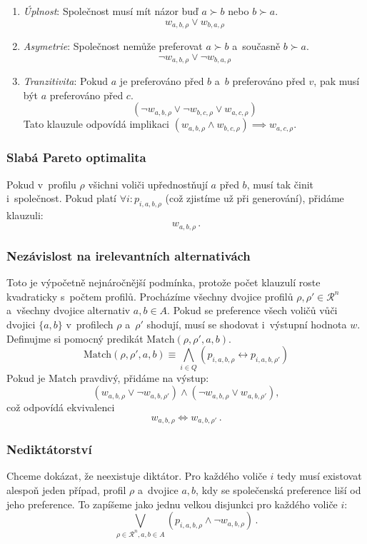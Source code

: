 \documentclass[a4paper, 11pt]{article}
\begin{document}
\begin{enumerate}
    \item \emph{Úplnost}: Společnost musí mít názor buď $a \succ b$ nebo $b \succ a$.
          \[
              w_{a, b, \rho} \lor w_{b, a, \rho}
          \]
    \item \emph{Asymetrie}: Společnost nemůže preferovat $a \succ b$ a~současně $b \succ a$.
          \[
              \neg w_{a, b, \rho} \lor \neg w_{b, a, \rho}
          \]
    \item \emph{Tranzitivita}: Pokud $a$ je preferováno před $b$ a~$b$ preferováno před $v$, pak musí být $a$ preferováno před $c$.
          \[
              (\neg w_{a, b, \rho} \lor \neg w_{b, c, \rho} \lor w_{a, c, \rho})
          \]
          Tato klauzule odpovídá implikaci $(w_{a, b, \rho} \land w_{b, c, \rho}) \implies w_{a, c, \rho}$.
\end{enumerate}

\subsubsection{Slabá Pareto optimalita}
Pokud v~profilu $\rho$ všichni voliči upřednostňují $a$ před $b$, musí tak činit i~společnost.
Pokud platí $\forall i \colon p_{i, a, b, \rho}$ (což zjistíme už při generování), přidáme klauzuli:
\[
    w_{a, b, \rho}\,.
\]

\subsubsection{Nezávislost na irelevantních alternativách}
Toto je výpočetně nejnáročnější podmínka, protože počet klauzulí roste kvadraticky s~počtem profilů.
Procházíme všechny dvojice profilů $\rho, \rho' \in \mathcal{R}^n$ a~všechny dvojice alternativ $a, b \in A$.
Pokud se preference všech voličů vůči dvojici $\{a, b\}$ v~profilech $\rho$ a~$\rho'$ shodují, musí se shodovat i~výstupní hodnota $w$.
Definujme si pomocný predikát $\text{Match}(\rho, \rho', a, b)$.
\[
    \text{Match}(\rho, \rho', a, b) \equiv \bigwedge_{i \in Q} (p_{i, a, b, \rho} \leftrightarrow p_{i, a, b, \rho'})
\]
Pokud je $\text{Match}$ pravdivý, přidáme na výstup:
\[
    (w_{a, b, \rho} \lor \neg w_{a, b, \rho'}) \land (\neg w_{a, b, \rho} \lor w_{a, b, \rho'}),
\]
což odpovídá ekvivalenci
\[
    w_{a, b, \rho} \iff w_{a, b, \rho'}\,.
\]

\subsubsection{Nediktátorství}
Chceme dokázat, že neexistuje diktátor. Pro každého voliče $i$ tedy musí existovat alespoň jeden případ, profil $\rho$ a~dvojice $a, b$, kdy se společenská preference liší od jeho preference.
To zapíšeme jako jednu velkou disjunkci pro každého voliče $i$:
\[
    \bigvee_{\rho \in \mathcal{R}^n, a, b \in A} (p_{i, a, b, \rho} \land \neg w_{a, b, \rho})\,.
\]
\end{document}
